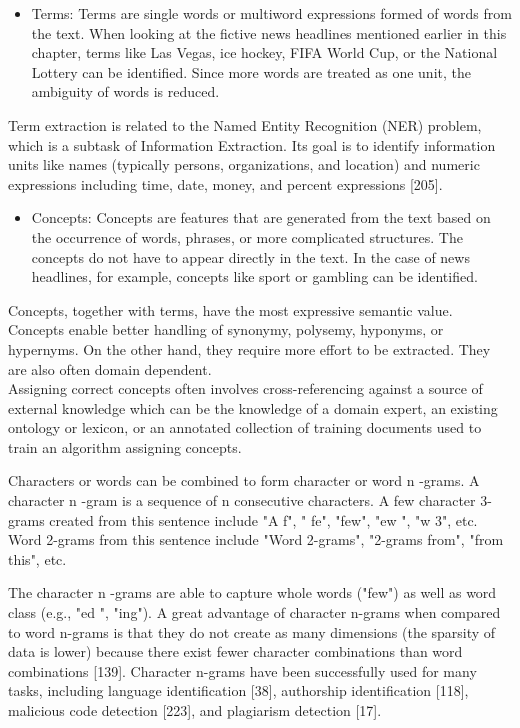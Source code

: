 \documentclass[10pt]{book}
\begin{document}
\begin{itemize}
  \item Terms: Terms are single words or multiword expressions formed of words from the text. When looking at the fictive news headlines mentioned earlier in this chapter, terms like Las Vegas, ice hockey, FIFA World Cup, or the National Lottery can be identified. Since more words are treated as one unit, the ambiguity of words is reduced.
\end{itemize}

Term extraction is related to the Named Entity Recognition (NER) problem, which is a subtask of Information Extraction. Its goal is to identify information units like names (typically persons, organizations, and location) and numeric expressions including time, date, money, and percent expressions [205].

\begin{itemize}
  \item Concepts: Concepts are features that are generated from the text based on the occurrence of words, phrases, or more complicated structures. The concepts do not have to appear directly in the text. In the case of news headlines, for example, concepts like sport or gambling can be identified.
\end{itemize}

Concepts, together with terms, have the most expressive semantic value. Concepts enable better handling of synonymy, polysemy, hyponyms, or hypernyms. On the other hand, they require more effort to be extracted. They are also often domain dependent.\\
Assigning correct concepts often involves cross-referencing against a source of external knowledge which can be the knowledge of a domain expert, an existing ontology or lexicon, or an annotated collection of training documents used to train an algorithm assigning concepts.

Characters or words can be combined to form character or word n -grams. A character n -gram is a sequence of n consecutive characters. A few character 3-grams created from this sentence include "A f", " fe", "few", "ew ", "w 3", etc. Word 2-grams from this sentence include "Word 2-grams", "2-grams from", "from this", etc.

The character n -grams are able to capture whole words ("few") as well as word class (e.g., "ed ", "ing"). A great advantage of character n-grams when compared to word n-grams is that they do not create as many dimensions (the sparsity of data is lower) because there exist fewer character combinations than word combinations [139]. Character n-grams have been successfully used for many tasks, including language identification [38], authorship identification [118], malicious code detection [223], and plagiarism detection [17].
\end{document}
